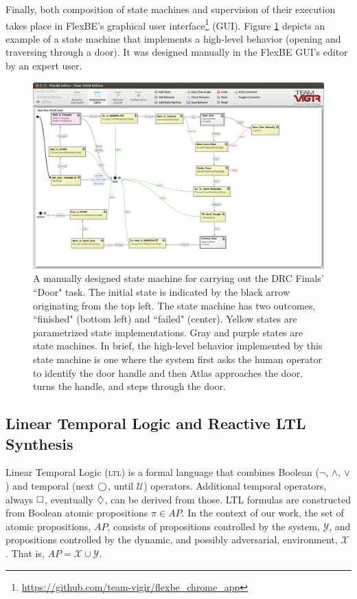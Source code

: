 Finally, both composition of state machines and supervision of their execution takes place in FlexBE's graphical user interface\footnote{\scriptsize{\url{https://github.com/team-vigir/flexbe_chrome_app}}} (GUI).
Figure \ref{Fig:FlexBESM} depicts an example of a state machine that implements a high-level behavior (opening and traversing through a door).
It was designed manually in the FlexBE GUI's editor by an expert user.

\begin{figure}[t]
\centering
\includegraphics[width=0.99\columnwidth,clip]{./img/behavior_open_door.png}
\caption{A manually designed state machine for carrying out the DRC Finals' ``Door" task.
The initial state is indicated by the black arrow originating from the top left.
The state machine has two outcomes, ``finished" (bottom left) and ``failed" (center).
Yellow states are parametrized state implementations.
Gray and purple states are state machines.
In brief, the high-level behavior implemented by this state machine is one where the system first asks the human operator to identify the door handle and then Atlas approaches the door, turns the handle, and steps through the door.
}
\label{Fig:FlexBESM}
\end{figure}

\subsection{Linear Temporal Logic and Reactive LTL Synthesis}\label{S:GR1}

Linear Temporal Logic (\textsc{ltl}) is a formal language that combines Boolean ($\lnot$, $\wedge$, $\lor$) and temporal (next $\operatorname{\bigcirc}$, until $\mathcal{U}$) operators.
Additional temporal operators, always $\operatorname{\Box}$, eventually $\operatorname{\diamondsuit}$, can be derived from those.
\textsc{LTL} formulas are constructed from Boolean atomic propositions $\pi \in AP$.
In the context of our work, the set of atomic propositions, $AP$, consists of propositions controlled by the system, $\mathcal{Y}$, and propositions controlled by the dynamic, and possibly adversarial, environment, $\mathcal{X}$. That is, $AP = \mathcal{X} \cup \mathcal{Y}$.

